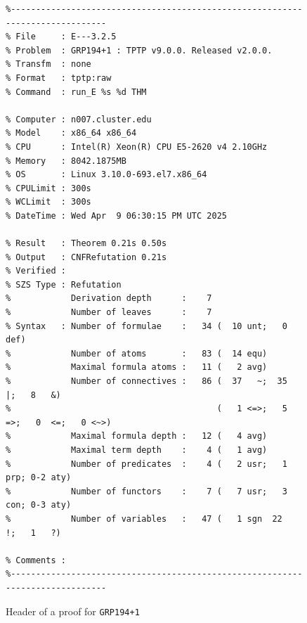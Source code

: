 \documentclass[runningheads]{llncs}
\begin{document}
\begin{figure}[htb]
\centering
{\scriptsize
{\setlength{\baselineskip}{2.5mm}
\begin{verbatim}
%------------------------------------------------------------------------------
% File     : E---3.2.5
% Problem  : GRP194+1 : TPTP v9.0.0. Released v2.0.0.
% Transfm  : none
% Format   : tptp:raw
% Command  : run_E %s %d THM

% Computer : n007.cluster.edu
% Model    : x86_64 x86_64
% CPU      : Intel(R) Xeon(R) CPU E5-2620 v4 2.10GHz
% Memory   : 8042.1875MB
% OS       : Linux 3.10.0-693.el7.x86_64
% CPULimit : 300s
% WCLimit  : 300s
% DateTime : Wed Apr  9 06:30:15 PM UTC 2025

% Result   : Theorem 0.21s 0.50s
% Output   : CNFRefutation 0.21s
% Verified : 
% SZS Type : Refutation
%            Derivation depth      :    7
%            Number of leaves      :    7
% Syntax   : Number of formulae    :   34 (  10 unt;   0 def)
%            Number of atoms       :   83 (  14 equ)
%            Maximal formula atoms :   11 (   2 avg)
%            Number of connectives :   86 (  37   ~;  35   |;   8   &)
%                                         (   1 <=>;   5  =>;   0  <=;   0 <~>)
%            Maximal formula depth :   12 (   4 avg)
%            Maximal term depth    :    4 (   1 avg)
%            Number of predicates  :    4 (   2 usr;   1 prp; 0-2 aty)
%            Number of functors    :    7 (   7 usr;   3 con; 0-3 aty)
%            Number of variables   :   47 (   1 sgn  22   !;   1   ?)

% Comments : 
%------------------------------------------------------------------------------
\end{verbatim}
}}
\caption{Header of a proof for {\tt GRP194+1}}
\label{ExampleDerivationHeader}
\end{figure}
\end{document}
